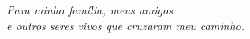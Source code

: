 \begin{dedicatoria}
   \vspace*{\fill}
   \centering
   \noindent
   \textit{Para minha família, meus amigos \\e outros seres vivos que cruzaram meu caminho.} \vspace*{\fill}
\end{dedicatoria}

